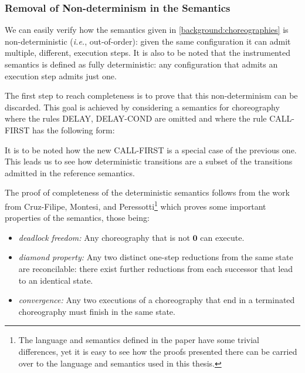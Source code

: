 \documentclass[12pt,a4paper,twoside]{book}
\makeatletter
\newcommand{\tlint}[1]{\tau@#1}
\makeatother
\begin{document}
\subsubsection{Removal of Non-determinism in the Semantics}
We can easily verify how the semantics given in \ref{background:choreographies} is non-deterministic (\emph{i.e.}, out-of-order): given the same configuration it can admit multiple, different, execution steps. It is also to be noted that the instrumented semantics is defined as fully deterministic: any configuration that admits an execution step admits just one.

The first step to reach completeness is to prove that this non-determinism can be discarded.
This goal is achieved by considering a semantics for choreography where the rules DELAY, DELAY-COND are omitted and where the rule CALL-FIRST has the following form:
\bigskip

\noindent\makebox[\textwidth][c]{\resizebox{1.0 \textwidth}{!}{$
    \inferrule*[right=call-first] { X(\vec{q}~) = C \in \mathscr{C} \\ \vec{p} = p_1, \ldots, p_n }
	{\langle X(\vec{p}~);C', \Sigma, \mathscr{C} \rangle \xrightarrow{\tlint{p_1}} \langle p_2 : X(\vec{p}~).C'; \ldots; p_n : X(\vec{p}~).C'; C[\vec{q}/\vec{p}~] \fatsemi C', \Sigma, \mathscr{C} \rangle}
$}}

\bigskip
\noindent It is to be noted how the new CALL-FIRST is a special case of the previous one. This leads us to see how deterministic transitions are a subset of the transitions admitted in the reference semantics.

The proof of completeness of the deterministic semantics follows from the work from Cruz-Filipe, Montesi, and Peressotti\cite{cruz2023formal}\footnote{The language and semantics defined in the paper have some trivial differences, yet it is easy to see how the proofs presented there can be carried over to the language and semantics used in this thesis.} which proves some important properties of the semantics, those being:
\begin{itemize}
\item\emph{deadlock freedom:} Any choreography that is not $\boldsymbol{0}$ can execute.
\item\emph{diamond property:} Any two distinct one-step reductions from the same state are reconcilable: there exist further reductions from each successor that lead to an identical state.
\item\emph{convergence:} Any two executions of a choreography that end
in a terminated choreography must finish in the same state.
\end{itemize}
\end{document}
